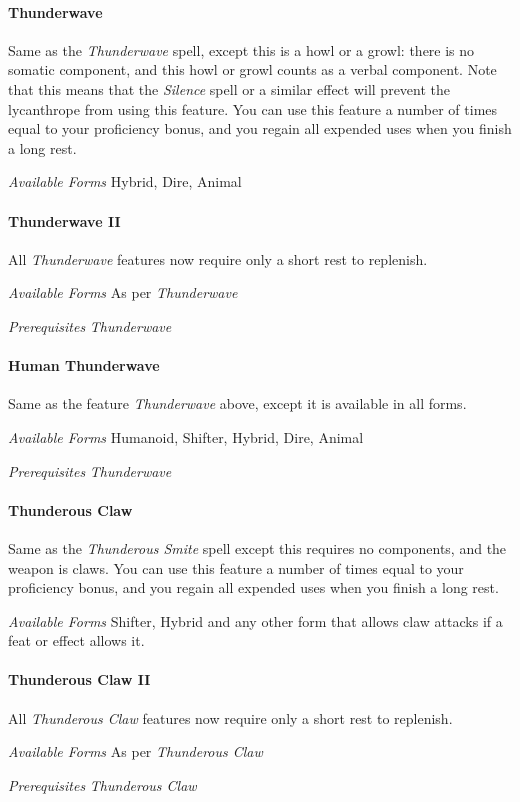 \documentclass[twocolumn]{dndbook}
\begin{document}
\paragraph*{Thunderwave}
Same as the \emph{Thunderwave} spell, except this is a howl or a growl: there is no somatic component, and this howl or growl counts as a verbal component.
Note that this means that the \emph{Silence} spell or a similar effect will prevent the lycanthrope from using this feature.
You can use this feature a number of times equal to your proficiency bonus, and you regain all expended uses when you finish a long rest.\par
\emph{Available Forms} Hybrid, Dire, Animal\par

\paragraph*{Thunderwave II}
All \emph{Thunderwave} features now require only a short rest to replenish.\par
\emph{Available Forms} As per \emph{Thunderwave} \par
\emph{Prerequisites} \emph{Thunderwave}\par

\paragraph*{Human Thunderwave}
Same as the feature \emph{Thunderwave} above, except it is available in all forms.\par\par
\emph{Available Forms} Humanoid, Shifter, Hybrid, Dire, Animal\par
\emph{Prerequisites} \emph{Thunderwave}\par

\paragraph*{Thunderous Claw}
Same as the \emph{Thunderous Smite} spell except this requires no components, and the weapon is claws.
You can use this feature a number of times equal to your proficiency bonus, and you regain all expended uses when you finish a long rest.\par
\emph{Available Forms} Shifter, Hybrid and any other form that allows claw attacks if a feat or effect allows it.\par

\paragraph*{Thunderous Claw II}
All \emph{Thunderous Claw} features now require only a short rest to replenish.\par
\emph{Available Forms} As per \emph{Thunderous Claw} \par
\emph{Prerequisites} \emph{Thunderous Claw}\par
\end{document}
